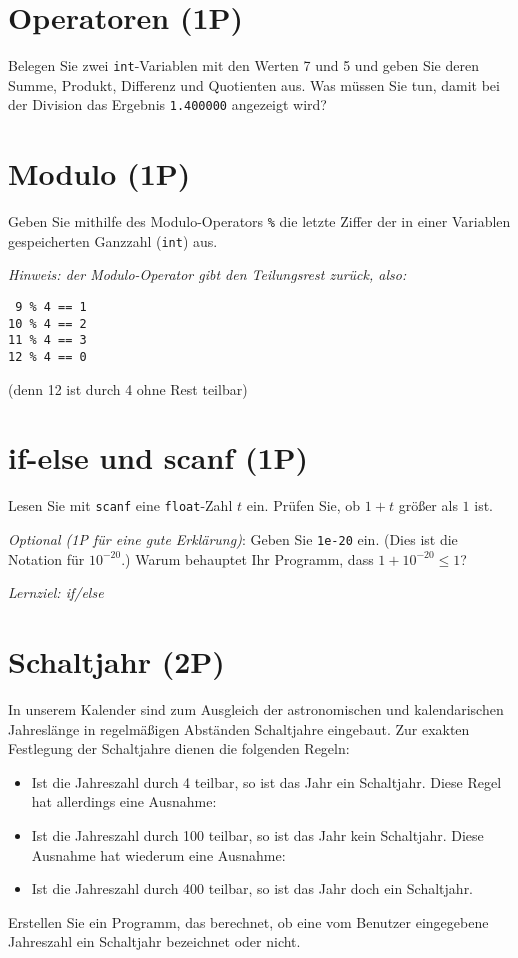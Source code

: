 \documentclass[
	ngerman,
	fontsize=10pt,
	parskip=half,
	titlepage=true,
	DIV=12
]{scrartcl}
\newcommand*{\inC}[1]{\texttt{#1}}
\begin{document}
\section{Operatoren (1P)}
Belegen Sie zwei \inC{int}-Variablen mit den Werten 7 und 5 und geben Sie deren Summe, Produkt, Differenz und Quotienten aus. Was müssen Sie tun, damit bei der Division das Ergebnis \texttt{1.400000} angezeigt wird?


\section{Modulo (1P)}
Geben Sie mithilfe des Modulo-Operators \texttt{\%} die letzte Ziffer der in einer Variablen gespeicherten Ganzzahl (\inC{int}) aus.

\emph{Hinweis: der Modulo-Operator gibt den Teilungsrest  zurück, also:}
\begin{center}
\texttt{ 9 \% 4 == 1}\\
\texttt{10 \% 4 == 2}\\
\texttt{11 \% 4 == 3}\\
\texttt{12 \% 4 == 0}
\end{center}
(denn 12 ist durch 4 ohne Rest teilbar)

\section{if-else und scanf (1P)}
Lesen Sie mit \texttt{scanf} eine \texttt{float}-Zahl $t$ ein. Prüfen Sie, ob \mbox{$1 + t$} größer als $1$ ist. 

\emph{Optional (1P für eine gute Erklärung)}: Geben Sie \texttt{1e-20} ein. (Dies ist die Notation für $10^{-20}$.) Warum behauptet Ihr Programm, dass $1 + 10^{-20} \leq 1$?

\emph{Lernziel: if/else}


\section{Schaltjahr (2P)}
In unserem Kalender sind zum Ausgleich der astronomischen und kalendarischen
Jahreslänge in regelmäßigen Abständen Schaltjahre eingebaut.
Zur exakten Festlegung der Schaltjahre dienen die folgenden Regeln:

\begin{itemize}
  \item Ist die Jahreszahl durch 4 teilbar,
  so ist das Jahr ein Schaltjahr. Diese Regel hat allerdings eine Ausnahme: 
  \item Ist die Jahreszahl durch 100 teilbar,
  so ist das Jahr kein Schaltjahr. Diese Ausnahme hat 
  wiederum eine Ausnahme: 
  \item Ist die Jahreszahl durch 400 teilbar, so ist das Jahr doch ein Schaltjahr. 
\end{itemize}
Erstellen Sie ein Programm, das berechnet, ob eine vom Benutzer eingegebene Jahreszahl ein 
Schaltjahr bezeichnet oder nicht.
\end{document}
